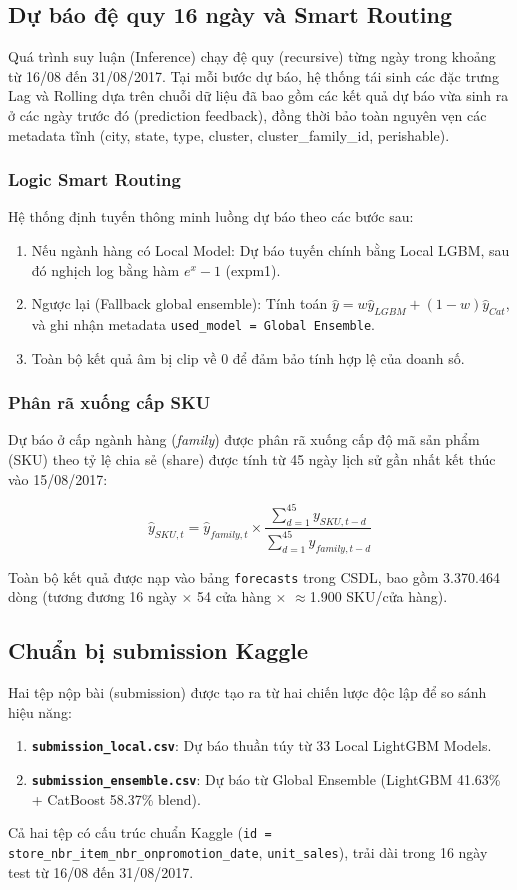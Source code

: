 \documentclass[12pt,a4paper]{report}
\begin{document}
\subsection{Dự báo đệ quy 16 ngày và Smart Routing}
Quá trình suy luận (Inference) chạy đệ quy (recursive) từng ngày trong khoảng từ 16/08 đến 31/08/2017. Tại mỗi bước dự báo, hệ thống tái sinh các đặc trưng Lag và Rolling dựa trên chuỗi dữ liệu đã bao gồm các kết quả dự báo vừa sinh ra ở các ngày trước đó (prediction feedback), đồng thời bảo toàn nguyên vẹn các metadata tĩnh (city, state, type, cluster, cluster\_family\_id, perishable).

\subsubsection{Logic Smart Routing}
Hệ thống định tuyến thông minh luồng dự báo theo các bước sau:
\begin{enumerate}
    \item Nếu ngành hàng có Local Model: Dự báo tuyến chính bằng Local LGBM, sau đó nghịch log bằng hàm $e^{x} - 1$ (expm1).
    \item Ngược lại (Fallback global ensemble): Tính toán $\hat{y} = w \hat{y}_{LGBM} + (1-w) \hat{y}_{Cat}$, và ghi nhận metadata \texttt{used\_model = Global Ensemble}.
    \item Toàn bộ kết quả âm bị clip về 0 để đảm bảo tính hợp lệ của doanh số.
\end{enumerate}

\subsubsection{Phân rã xuống cấp SKU}
Dự báo ở cấp ngành hàng (\textit{family}) được phân rã xuống cấp độ mã sản phẩm (SKU) theo tỷ lệ chia sẻ (share) được tính từ 45 ngày lịch sử gần nhất kết thúc vào 15/08/2017:

\begin{equation}
    \hat{y}_{SKU, t} = \hat{y}_{family, t} \times \frac{\sum_{d=1}^{45} y_{SKU, t-d}}{\sum_{d=1}^{45} y_{family, t-d}}
\end{equation}

Toàn bộ kết quả được nạp vào bảng \texttt{forecasts} trong CSDL, bao gồm 3.370.464 dòng (tương đương 16 ngày $\times$ 54 cửa hàng $\times$ $\approx$1.900 SKU/cửa hàng).

\subsection{Chuẩn bị submission Kaggle}
Hai tệp nộp bài (submission) được tạo ra từ hai chiến lược độc lập để so sánh hiệu năng:
\begin{enumerate}
    \item \textbf{\texttt{submission\_local.csv}}: Dự báo thuần túy từ 33 Local LightGBM Models.
    \item \textbf{\texttt{submission\_ensemble.csv}}: Dự báo từ Global Ensemble (LightGBM 41.63\% + CatBoost 58.37\% blend).
\end{enumerate}
Cả hai tệp có cấu trúc chuẩn Kaggle (\texttt{id = store\_nbr\_item\_nbr\_onpromotion\_date}, \texttt{unit\_sales}), trải dài trong 16 ngày test từ 16/08 đến 31/08/2017.
\end{document}
